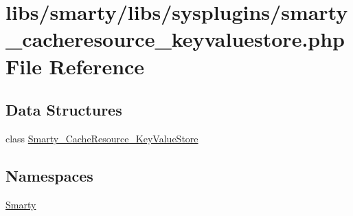 \hypertarget{smarty__cacheresource__keyvaluestore_8php}{}\section{libs/smarty/libs/sysplugins/smarty\+\_\+cacheresource\+\_\+keyvaluestore.php File Reference}
\label{smarty__cacheresource__keyvaluestore_8php}
\subsection*{Data Structures}
\begin{DoxyCompactItemize}
\item 
class \hyperlink{class_smarty___cache_resource___key_value_store}{Smarty\+\_\+\+Cache\+Resource\+\_\+\+Key\+Value\+Store}
\end{DoxyCompactItemize}
\subsection*{Namespaces}
\begin{DoxyCompactItemize}
\item 
 \hyperlink{namespace_smarty}{Smarty}
\end{DoxyCompactItemize}
